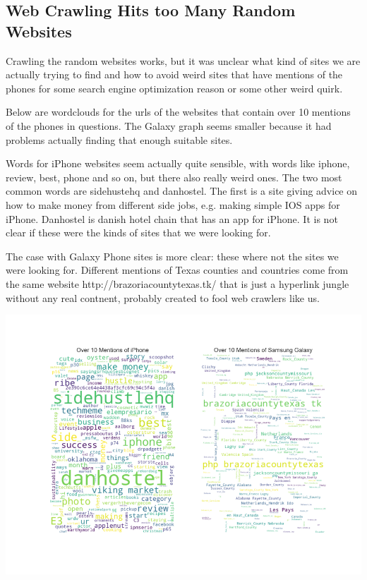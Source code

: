 \documentclass[12pt,a4paper,leqno]{report}
\theoremstyle{plain}
\theoremstyle{definition}
\theoremstyle{remark}
\begin{document}
\subsection{Web Crawling Hits too Many Random Websites}

Crawling the random websites works, but it was unclear what kind of sites we are
actually trying to find and how to avoid weird sites that have mentions of the
phones for some search engine optimization reason or some other weird quirk.

Below are wordclouds for the urls of the websites that contain over 10 mentions
of the phones in questions. The Galaxy graph seems smaller because it had problems
actually finding that enough suitable sites.

Words for iPhone websites seem actually quite sensible, with words like iphone, review, best,
phone and so on, but there also really weird ones. The two most common words are sidehustehq
and danhostel. The first is a site giving advice on how to make money from different
side jobs, e.g. making simple IOS apps for iPhone. Danhostel is danish hotel chain
that has an app for iPhone. It is not clear if these were the kinds of sites that we
were looking for.

The case with Galaxy Phone sites is more clear: these where not the sites we were looking for.
Different mentions of Texas counties and countries come from the same website
http://brazoriacountytexas.tk/ that is just a hyperlink jungle without any real contnent,
probably created to fool web crawlers like us.

{
    \centering
    \includegraphics[width=\textwidth,height=\textheight,keepaspectratio]{wordclouds_for_sites_with_lots_of_mentions.png}
    \par
}
\end{document}

